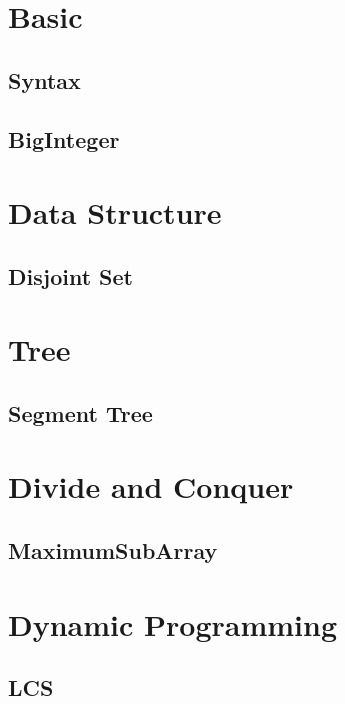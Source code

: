 \section{Basic}

\subsection{Syntax}


\subsection{BigInteger}

\section{Data Structure}

\subsection{Disjoint Set}

\section{Tree}

\subsection{Segment Tree}

\section{Divide and Conquer}

\subsection{MaximumSubArray}

\section{Dynamic Programming}

\subsection{LCS}


